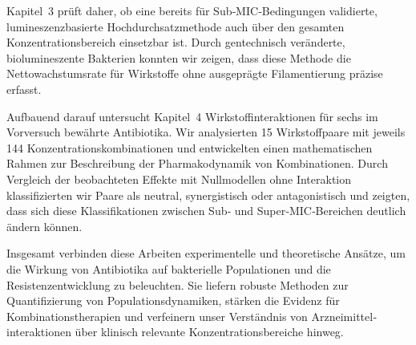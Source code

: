 Kapitel~3 prüft daher, ob eine bereits für Sub‑MIC‑Bedingungen validierte, lumineszenzbasierte Hochdurchsatzmethode auch über den gesamten Konzentrationsbereich einsetzbar ist.
Durch gentechnisch veränderte, biolumineszente Bakterien konnten wir zeigen, dass diese Methode die Nettowachstumsrate für Wirkstoffe ohne ausgeprägte Filamentierung präzise erfasst.

Aufbauend darauf untersucht Kapitel~4 Wirkstoff­interaktionen für sechs im Vorversuch bewährte Antibiotika.
Wir analysierten 15 Wirkstoffpaare mit jeweils 144 Konzentrations­kombinationen und entwickelten einen mathematischen Rahmen zur Beschreibung der Pharmakodynamik von Kombinationen.
Durch Vergleich der beobachteten Effekte mit Nullmodellen ohne Interaktion klassifizierten wir Paare als neutral, synergistisch oder antagonistisch und zeigten, dass sich diese Klassifikationen zwischen Sub‑ und Super‑MIC‑Bereichen deutlich ändern können.

Insgesamt verbinden diese Arbeiten experimentelle und theoretische Ansätze, um die Wirkung von Antibiotika auf bakterielle Populationen und die Resistenzentwicklung zu beleuchten.
Sie liefern robuste Methoden zur Quantifizierung von Populationsdynamiken, stärken die Evidenz für Kombinationstherapien und verfeinern unser Verständnis von Arzneimittel­interaktionen über klinisch relevante Konzentrationsbereiche hinweg.
